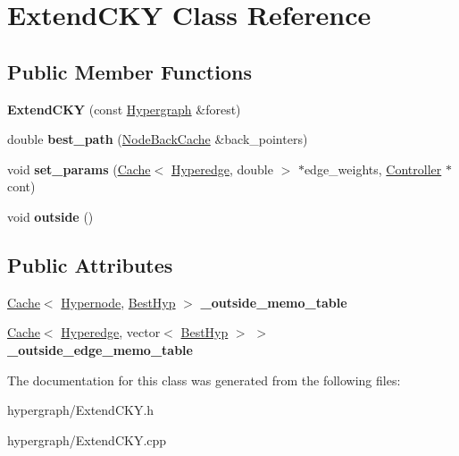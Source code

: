 \hypertarget{classExtendCKY}{
\section{ExtendCKY Class Reference}
\label{classExtendCKY}
}
\subsection*{Public Member Functions}
\begin{DoxyCompactItemize}
\item 
\hypertarget{classExtendCKY_a20aad60b837caf99aa07cbbe9093901e}{
{\bfseries ExtendCKY} (const \hyperlink{classScarab_1_1Hypergraph}{Hypergraph} \&forest)}
\label{classExtendCKY_a20aad60b837caf99aa07cbbe9093901e}

\item 
\hypertarget{classExtendCKY_af39407a663c5e5cc017343b7a8f12fee}{
double {\bfseries best\_\-path} (\hyperlink{classCache}{NodeBackCache} \&back\_\-pointers)}
\label{classExtendCKY_af39407a663c5e5cc017343b7a8f12fee}

\item 
\hypertarget{classExtendCKY_a71797754255237fbbf21018aaa312ef0}{
void {\bfseries set\_\-params} (\hyperlink{classCache}{Cache}$<$ \hyperlink{classScarab_1_1Hyperedge}{Hyperedge}, double $>$ $\ast$edge\_\-weights, \hyperlink{classController}{Controller} $\ast$cont)}
\label{classExtendCKY_a71797754255237fbbf21018aaa312ef0}

\item 
\hypertarget{classExtendCKY_ac4d489259324dbbc5cc5fda2866560e2}{
void {\bfseries outside} ()}
\label{classExtendCKY_ac4d489259324dbbc5cc5fda2866560e2}

\end{DoxyCompactItemize}
\subsection*{Public Attributes}
\begin{DoxyCompactItemize}
\item 
\hypertarget{classExtendCKY_a1572ad77e37dcd89a95902f1b7eaae95}{
\hyperlink{classCache}{Cache}$<$ \hyperlink{classScarab_1_1Hypernode}{Hypernode}, \hyperlink{classBestHyp}{BestHyp} $>$ {\bfseries \_\-outside\_\-memo\_\-table}}
\label{classExtendCKY_a1572ad77e37dcd89a95902f1b7eaae95}

\item 
\hypertarget{classExtendCKY_a9aa8c8f5bc3dfda2e35810fd56654ec9}{
\hyperlink{classCache}{Cache}$<$ \hyperlink{classScarab_1_1Hyperedge}{Hyperedge}, vector$<$ \hyperlink{classBestHyp}{BestHyp} $>$ $>$ {\bfseries \_\-outside\_\-edge\_\-memo\_\-table}}
\label{classExtendCKY_a9aa8c8f5bc3dfda2e35810fd56654ec9}

\end{DoxyCompactItemize}


The documentation for this class was generated from the following files:\begin{DoxyCompactItemize}
\item 
hypergraph/ExtendCKY.h\item 
hypergraph/ExtendCKY.cpp\end{DoxyCompactItemize}
